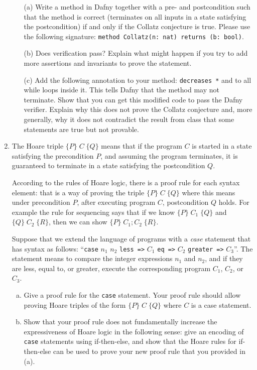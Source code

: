\documentclass{article}
\newcommand{\hoare}[3]{\{#1\} \; #2 \; \{#3\}}
\begin{document}
\begin{enumerate}
\begin{enumerate}
\item[(a)]
Write a method in Dafny together with a pre- and postcondition
such that the method is correct (terminates on all inputs in a state satisfying the postcondition)
if and only if the Collatz conjecture is true. Please use the following signature: \texttt{method Collatz(n: nat) returns (b: bool)}.

\item[(b)]
Does verification pass?
Explain what might happen if you try to add more assertions and invariants to prove the statement.

\item[(c)]
Add the following annotation to your method:
\texttt{decreases *} and to all while loops inside it.
This tells Dafny that the method may not terminate.
Show that you can get this modified code to pass the Dafny verifier.
Explain why this does not prove the Collatz conjecture and, more generally,
why it does not contradict the result from class that some statements are true but not provable.

\end{enumerate}

\item
The Hoare triple $\hoare{P}{C}{Q}$ means that if the program $C$ is started in a state
satisfying the precondition $P$, and assuming the program terminates,
it is guaranteed to terminate in a state satisfying the postcondition $Q$.

According to the rules of Hoare logic,
there is a proof rule for each syntax element: that is a way of proving
the triple $\hoare{P}{C}{Q}$ where this means under precondition $P$, after executing program $C$, postcondition $Q$ holds.
For example the rule for sequencing says that if we know $\hoare{P}{C_1}{Q}$ and $\hoare{Q}{C_2}{R}$,
then we can show $\hoare{P}{C_1; C_2}{R}$.

Suppose that we extend the language of programs with a \emph{case} statement that has syntax as follows:
``\texttt{case} $n_1$ $n_2$ \texttt{less =>} $C_1$ \texttt{eq =>} $C_2$ \texttt{greater =>} $C_3$''.
The statement means to compare the integer expressions $n_1$ and $n_2$, and if they are less, equal to, or greater, execute the corresponding program $C_1$, $C_2$, or $C_3$.

\begin{enumerate}[(a)]
\item Give a proof rule for the \texttt{case} statement. Your proof rule should allow proving
Hoare triples of the form $\hoare{P}{C}{Q}$ where $C$ is a case statement.
\item Show that your proof rule does not fundamentally increase the expressiveness of Hoare logic in the following sense: give an encoding of \texttt{case} statements using if-then-else,
and show that the Hoare rules for if-then-else can be used to prove your new proof rule that you provided in (a).
\end{enumerate}


\end{enumerate}
\end{document}
